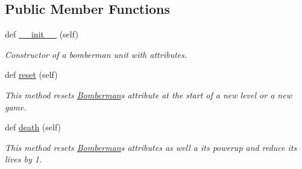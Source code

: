 \subsection*{Public Member Functions}
\begin{DoxyCompactItemize}
\item 
\hypertarget{classsrc_1_1bomberman_1_1_bomberman_ad9cdb2bcd44e1aaec299743531de5473}{}def \hyperlink{classsrc_1_1bomberman_1_1_bomberman_ad9cdb2bcd44e1aaec299743531de5473}{\+\_\+\+\_\+init\+\_\+\+\_\+} (self)\label{classsrc_1_1bomberman_1_1_bomberman_ad9cdb2bcd44e1aaec299743531de5473}

\begin{DoxyCompactList}\small\item\em Constructor of a bomberman unit with attributes. \end{DoxyCompactList}\item 
\hypertarget{classsrc_1_1bomberman_1_1_bomberman_a7d6de2893ff7ce0bed4cd72f15e9eb20}{}def \hyperlink{classsrc_1_1bomberman_1_1_bomberman_a7d6de2893ff7ce0bed4cd72f15e9eb20}{reset} (self)\label{classsrc_1_1bomberman_1_1_bomberman_a7d6de2893ff7ce0bed4cd72f15e9eb20}

\begin{DoxyCompactList}\small\item\em This method resets \hyperlink{classsrc_1_1bomberman_1_1_bomberman}{Bomberman}\textquotesingle{}s attribute at the start of a new level or a new game. \end{DoxyCompactList}\item 
\hypertarget{classsrc_1_1bomberman_1_1_bomberman_ae596075451ff8d73d59ff2cf9e4f7848}{}def \hyperlink{classsrc_1_1bomberman_1_1_bomberman_ae596075451ff8d73d59ff2cf9e4f7848}{death} (self)\label{classsrc_1_1bomberman_1_1_bomberman_ae596075451ff8d73d59ff2cf9e4f7848}

\begin{DoxyCompactList}\small\item\em This method resets \hyperlink{classsrc_1_1bomberman_1_1_bomberman}{Bomberman}\textquotesingle{}s attributes as well a its powerup and reduce its lives by 1. \end{DoxyCompactList}\end{DoxyCompactItemize}
